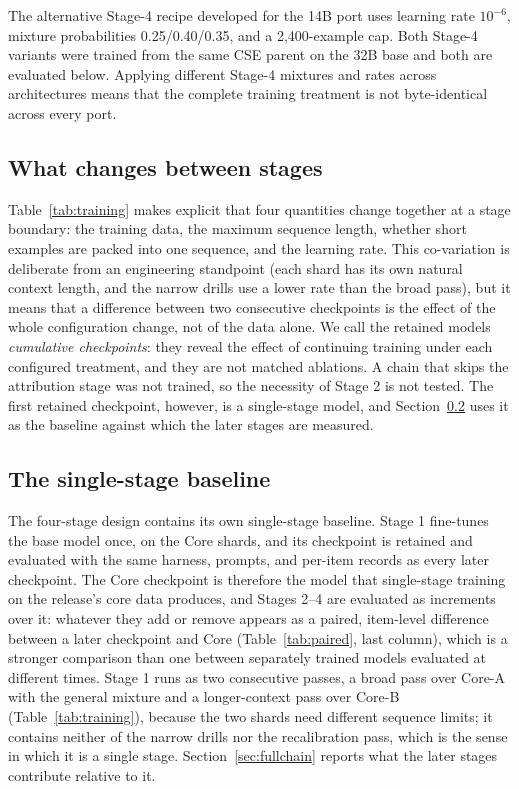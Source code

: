 \documentclass[twocolumn]{svjour3}
\begin{document}
The alternative Stage-4 recipe developed for the 14B port uses learning rate $10^{-6}$, mixture probabilities 0.25/0.40/0.35, and a 2,400-example cap. Both Stage-4 variants were trained from the same CSE parent on the 32B base and both are evaluated below. Applying different Stage-4 mixtures and rates across architectures means that the complete training treatment is not byte-identical across every port.

\subsection{What changes between stages}\label{sec:stagechanges}
Table~\ref{tab:training} makes explicit that four quantities change together at a stage boundary: the training data, the maximum sequence length, whether short examples are packed into one sequence, and the learning rate. This co-variation is deliberate from an engineering standpoint (each shard has its own natural context length, and the narrow drills use a lower rate than the broad pass), but it means that a difference between two consecutive checkpoints is the effect of the whole configuration change, not of the data alone. We call the retained models \emph{cumulative checkpoints}: they reveal the effect of continuing training under each configured treatment, and they are not matched ablations. A chain that skips the attribution stage was not trained, so the necessity of Stage 2 is not tested. The first retained checkpoint, however, is a single-stage model, and Section~\ref{sec:singlestage} uses it as the baseline against which the later stages are measured.

\subsection{The single-stage baseline}\label{sec:singlestage}
The four-stage design contains its own single-stage baseline. Stage 1 fine-tunes the base model once, on the Core shards, and its checkpoint is retained and evaluated with the same harness, prompts, and per-item records as every later checkpoint. The Core checkpoint is therefore the model that single-stage training on the release's core data produces, and Stages 2--4 are evaluated as increments over it: whatever they add or remove appears as a paired, item-level difference between a later checkpoint and Core (Table~\ref{tab:paired}, last column), which is a stronger comparison than one between separately trained models evaluated at different times. Stage 1 runs as two consecutive passes, a broad pass over Core-A with the general mixture and a longer-context pass over Core-B (Table~\ref{tab:training}), because the two shards need different sequence limits; it contains neither of the narrow drills nor the recalibration pass, which is the sense in which it is a single stage. Section~\ref{sec:fullchain} reports what the later stages contribute relative to it.
\end{document}
